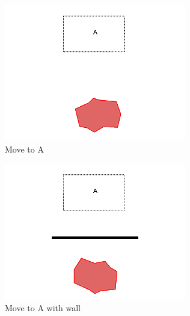 \documentclass[]{article}
\begin{document}
\begin{figure}
	\centering
	\begin{subfigure}{0.42\textwidth}
		\centering
		\includegraphics[width=\linewidth]{slide_images/Swarm_Robot_Control_-_Unknown_Number_of_Robots_0005.png}
		\caption{Move to A}
		\label{fig:sub1}
	\end{subfigure}%
	\begin{subfigure}{0.42\textwidth}
		\centering
		\includegraphics[width=\linewidth]{slide_images/Swarm_Robot_Control_-_Unknown_Number_of_Robots_0007.png}
		\caption{Move to A with wall}
		\label{fig:sub2}
	\end{subfigure}
	\begin{subfigure}{0.42\textwidth}

\end{subfigure}
\end{figure}
\end{document}
